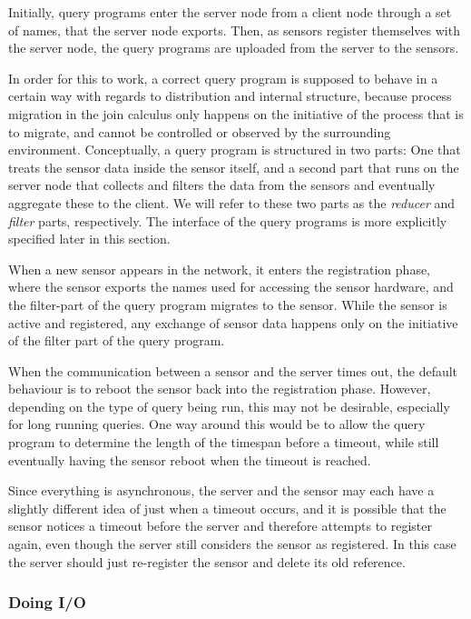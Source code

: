 Initially, query programs enter the server node from a client node
through a set of names, that the server node exports.
Then, as sensors register themselves with the server node, the query
programs are uploaded from the server to the sensors.

In order for this to work, a correct query program is supposed to
behave in a certain way with regards to distribution and internal
structure, because process migration in the join calculus only happens on
the initiative of the process that is to migrate, and cannot be controlled
or observed by the surrounding environment.
Conceptually, a query program is structured in two parts: One that
treats the sensor data inside the sensor itself, and a second part
that runs on the server node that collects and filters the data from
the sensors and eventually aggregate these to the client. We will refer
to these two parts as the \emph{reducer} and \emph{filter} parts, respectively.
The interface of the query programs is more explicitly specified later
in this section.

When a new sensor appears in the network, it enters the registration
phase, where the sensor exports the names used for accessing the 
sensor hardware, and the filter-part of the query program migrates to
the sensor.
While the sensor is active and registered, any exchange of sensor data
happens only on the initiative of the filter part of the query
program.

When the communication between a sensor and the server times out, the
default behaviour is to reboot the sensor back into the registration
phase.
However, depending on the type of query being run, this may not be desirable,
especially for long running queries.
One way around this would be to allow the query program to determine
the length of the timespan before a timeout, while still eventually 
having the sensor reboot when the timeout is reached.

Since everything is asynchronous, the server and the sensor may each
have a slightly different idea of just when a timeout occurs, and it
is possible that the sensor notices a timeout before the server and
therefore attempts to register again, even though the server still
considers the sensor as registered. In this case the server should
just re-register the sensor and delete its old reference.

\subsubsection{Doing I/O}

